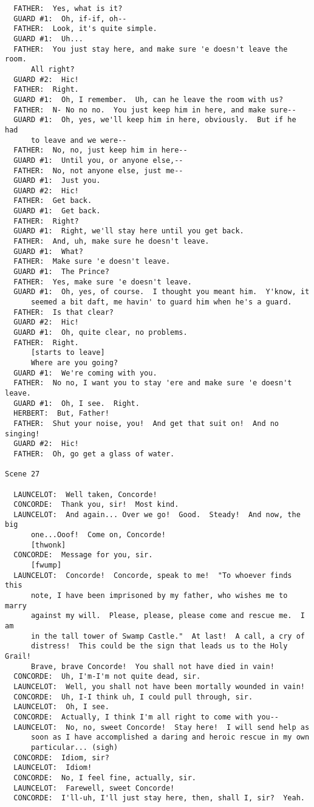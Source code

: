 \documentclass{article}
\begin{document}
\begin{verbatim}
  FATHER:  Yes, what is it?
  GUARD #1:  Oh, if-if, oh--
  FATHER:  Look, it's quite simple.
  GUARD #1:  Uh...
  FATHER:  You just stay here, and make sure 'e doesn't leave the room.
      All right?
  GUARD #2:  Hic!
  FATHER:  Right.
  GUARD #1:  Oh, I remember.  Uh, can he leave the room with us?
  FATHER:  N- No no no.  You just keep him in here, and make sure--
  GUARD #1:  Oh, yes, we'll keep him in here, obviously.  But if he had
      to leave and we were--
  FATHER:  No, no, just keep him in here--
  GUARD #1:  Until you, or anyone else,--
  FATHER:  No, not anyone else, just me--
  GUARD #1:  Just you.
  GUARD #2:  Hic!
  FATHER:  Get back.
  GUARD #1:  Get back.
  FATHER:  Right?
  GUARD #1:  Right, we'll stay here until you get back.
  FATHER:  And, uh, make sure he doesn't leave.
  GUARD #1:  What?
  FATHER:  Make sure 'e doesn't leave.
  GUARD #1:  The Prince?
  FATHER:  Yes, make sure 'e doesn't leave.
  GUARD #1:  Oh, yes, of course.  I thought you meant him.  Y'know, it
      seemed a bit daft, me havin' to guard him when he's a guard.
  FATHER:  Is that clear?
  GUARD #2:  Hic!
  GUARD #1:  Oh, quite clear, no problems.
  FATHER:  Right.
      [starts to leave]
      Where are you going?
  GUARD #1:  We're coming with you.
  FATHER:  No no, I want you to stay 'ere and make sure 'e doesn't leave.
  GUARD #1:  Oh, I see.  Right.
  HERBERT:  But, Father!
  FATHER:  Shut your noise, you!  And get that suit on!  And no singing!
  GUARD #2:  Hic!
  FATHER:  Oh, go get a glass of water.

Scene 27

  LAUNCELOT:  Well taken, Concorde!
  CONCORDE:  Thank you, sir!  Most kind.
  LAUNCELOT:  And again... Over we go!  Good.  Steady!  And now, the big
      one...Ooof!  Come on, Concorde!
      [thwonk]
  CONCORDE:  Message for you, sir.
      [fwump]
  LAUNCELOT:  Concorde!  Concorde, speak to me!  "To whoever finds this
      note, I have been imprisoned by my father, who wishes me to marry
      against my will.  Please, please, please come and rescue me.  I am
      in the tall tower of Swamp Castle."  At last!  A call, a cry of
      distress!  This could be the sign that leads us to the Holy Grail!
      Brave, brave Concorde!  You shall not have died in vain!
  CONCORDE:  Uh, I'm-I'm not quite dead, sir.
  LAUNCELOT:  Well, you shall not have been mortally wounded in vain!
  CONCORDE:  Uh, I-I think uh, I could pull through, sir.
  LAUNCELOT:  Oh, I see.
  CONCORDE:  Actually, I think I'm all right to come with you--
  LAUNCELOT:  No, no, sweet Concorde!  Stay here!  I will send help as
      soon as I have accomplished a daring and heroic rescue in my own
      particular... (sigh)
  CONCORDE:  Idiom, sir?
  LAUNCELOT:  Idiom!
  CONCORDE:  No, I feel fine, actually, sir.
  LAUNCELOT:  Farewell, sweet Concorde!
  CONCORDE:  I'll-uh, I'll just stay here, then, shall I, sir?  Yeah.


\end{verbatim}
\end{document}
